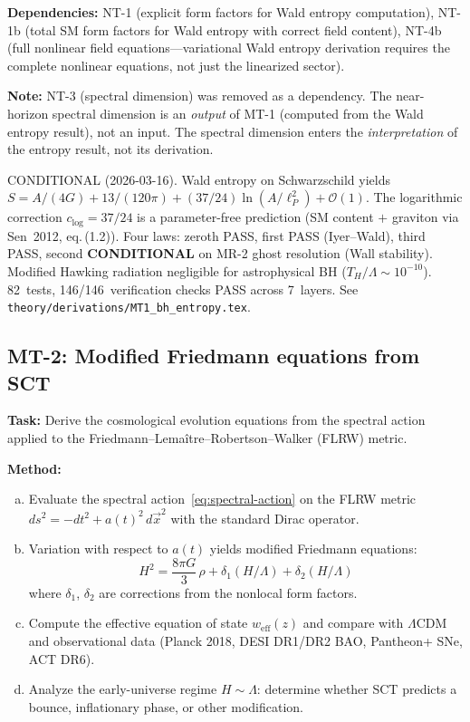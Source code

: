 \documentclass[12pt,a4paper]{article}
\newcommand{\Lam}{\Lambda}
\newcommand{\task}[1]{\noindent\textbf{Task:} #1\par}
\newcommand{\method}[1]{\noindent\textbf{Method:} #1\par}
\newcommand{\deps}[1]{\noindent\textbf{Dependencies:} #1\par}
\begin{document}
\deps{NT-1 (explicit form factors for Wald entropy computation),
NT-1b (total SM form factors for Wald entropy with correct field content),
NT-4b (full nonlinear field equations---variational Wald entropy derivation
requires the complete nonlinear equations, not just the linearized sector).}

\textbf{Note:} NT-3 (spectral dimension) was removed as a dependency.
The near-horizon spectral dimension is an \emph{output} of MT-1 (computed from
the Wald entropy result), not an input. The spectral dimension enters the
\emph{interpretation} of the entropy result, not its derivation.

\textcolor{near}{CONDITIONAL (2026-03-16).}
Wald entropy on Schwarzschild yields
$S = A/(4G) + 13/(120\pi) + (37/24)\ln(A/\ell_P^2) + \mathcal{O}(1)$.
The logarithmic correction $c_{\log} = 37/24$ is a parameter-free prediction
(SM content $+$ graviton via Sen~2012, eq.\,(1.2)).
Four laws: zeroth PASS, first PASS (Iyer--Wald), third PASS,
second \textbf{CONDITIONAL} on MR-2 ghost resolution (Wall stability).
Modified Hawking radiation negligible for astrophysical BH
($T_H/\Lambda \sim 10^{-10}$).
82~tests, 146/146~verification checks PASS across 7~layers.
See \texttt{theory/derivations/MT1\_bh\_entropy.tex}.

\subsection{MT-2: Modified Friedmann equations from SCT}
\label{task:MT2}

\task{Derive the cosmological evolution equations from the spectral action
applied to the Friedmann--Lema\^itre--Robertson--Walker (FLRW) metric.}

\method{
\begin{enumerate}[(a)]
  \item Evaluate the spectral action~\eqref{eq:spectral-action} on the FLRW metric
    $ds^2 = -dt^2 + a(t)^2\,d\vec{x}^2$ with the standard Dirac operator.
  \item Variation with respect to $a(t)$ yields modified Friedmann equations:
    \begin{equation}\label{eq:friedmann-mod}
      H^2 = \frac{8\pi G}{3}\,\rho
      + \delta_1(H/\Lam) + \delta_2(H/\Lam)
    \end{equation}
    where $\delta_1$, $\delta_2$ are corrections from the nonlocal form factors.
  \item Compute the effective equation of state $w_{\text{eff}}(z)$ and compare
    with $\Lambda$CDM and observational data (Planck 2018, DESI DR1/DR2 BAO,
    Pantheon+ SNe, ACT DR6).
  \item Analyze the early-universe regime $H \sim \Lam$: determine whether
    SCT predicts a bounce, inflationary phase, or other modification.
\end{enumerate}
}
\end{document}

